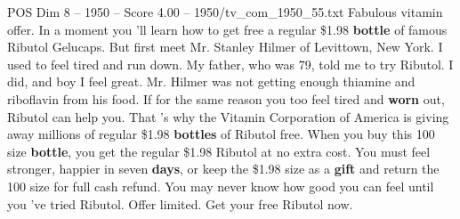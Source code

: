 \begin{textsample}{POS Dim 8 – 1950 – Score 4.00 – 1950/tv\_com\_1950\_55.txt}  \label{ex:f8_pos_003}
Fabulous vitamin offer.
In a moment you 'll learn how to get free a regular \$1.98 \textbf{bottle} of famous Ributol Gelucaps.
But first meet Mr.
Stanley Hilmer of Levittown, New York.
I used to feel tired and run down.
My father, who was 79, told me to try Ributol.
I did, and boy I feel great.
Mr.
Hilmer was not getting enough thiamine and riboflavin from his food.
If for the same reason you too feel tired and \textbf{worn} out, Ributol can help you.
That 's why the Vitamin Corporation of America is giving away millions of regular \$1.98 \textbf{bottles} of Ributol free.
When you buy this 100 size \textbf{bottle}, you get the regular \$1.98 Ributol at no extra cost.
You must feel stronger, happier in seven \textbf{days}, or keep the \$1.98 size as a \textbf{gift} and return the 100 size for full cash refund.
You may never know how good you can feel until you 've tried Ributol.
Offer limited.
Get your free Ributol now.

\end{textsample}
